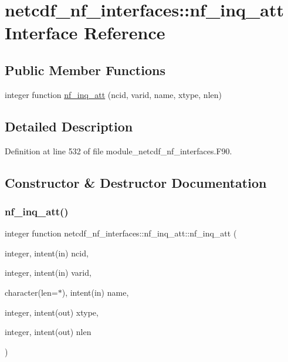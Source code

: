 \hypertarget{interfacenetcdf__nf__interfaces_1_1nf__inq__att}{}\section{netcdf\+\_\+nf\+\_\+interfaces\+:\+:nf\+\_\+inq\+\_\+att Interface Reference}
\label{interfacenetcdf__nf__interfaces_1_1nf__inq__att}
\subsection*{Public Member Functions}
\begin{DoxyCompactItemize}
\item 
integer function \hyperlink{interfacenetcdf__nf__interfaces_1_1nf__inq__att_a49bc1ea35f03ffb2c4aa0651f06e6499}{nf\+\_\+inq\+\_\+att} (ncid, varid, name, xtype, nlen)
\end{DoxyCompactItemize}


\subsection{Detailed Description}


Definition at line 532 of file module\+\_\+netcdf\+\_\+nf\+\_\+interfaces.\+F90.



\subsection{Constructor \& Destructor Documentation}
\mbox{\label{interfacenetcdf__nf__interfaces_1_1nf__inq__att_a49bc1ea35f03ffb2c4aa0651f06e6499}} 
\subsubsection{\texorpdfstring{nf\+\_\+inq\+\_\+att()}{nf\_inq\_att()}}
{\footnotesize\ttfamily integer function netcdf\+\_\+nf\+\_\+interfaces\+::nf\+\_\+inq\+\_\+att\+::nf\+\_\+inq\+\_\+att (\begin{DoxyParamCaption}\item[{integer, intent(in)}]{ncid,  }\item[{integer, intent(in)}]{varid,  }\item[{character(len=$\ast$), intent(in)}]{name,  }\item[{integer, intent(out)}]{xtype,  }\item[{integer, intent(out)}]{nlen }\end{DoxyParamCaption})}



